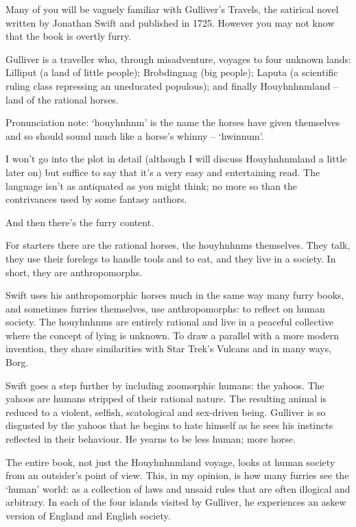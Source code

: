 
Many of you will be vaguely familiar with Gulliver's Travels, the satirical novel written by Jonathan Swift and published in 1725. However you may not know that the book is overtly furry.

Gulliver is a traveller who, through misadventure, voyages to four unknown lands: Lilliput (a land of little people); Brobdingnag (big people); Laputa (a scientific ruling class repressing an uneducated populous); and finally Houyhnhnmland -- land of the rational horses.

Pronunciation note: `houyhnhnm' is the name the horses have given themselves and so should sound much like a horse's whinny -- `hwinnum'.

I won't go into the plot in detail (although I will discuss Houyhnhnmland a little later on) but suffice to say that it's a very easy and entertaining read. The language isn't as antiquated as you might think; no more so than the contrivances used by some fantasy authors.

And then there's the furry content.

For starters there are the rational horses, the houyhnhnms themselves. They talk, they use their forelegs to handle tools and to eat, and they live in a society. In short, they are anthropomorphs.

Swift uses his anthropomorphic horses much in the same way many furry books, and sometimes furries themselves, use anthropomorphs: to reflect on human society. The houyhnhnms are entirely rational and live in a peaceful collective where the concept of lying is unknown. To draw a parallel with a more modern invention, they share similarities with Star Trek's Vulcans and in many ways, Borg.

Swift goes a step further by including zoomorphic humans: the yahoos. The yahoos are humans stripped of their rational nature. The resulting animal is reduced to a violent, selfish, scatological and sex-driven being. Gulliver is so disgusted by the yahoos that he begins to hate himself as he sees his instincts reflected in their behaviour. He yearns to be less human; more horse.

The entire book, not just the Houyhnhnmland voyage, looks at human society from an outsider's point of view. This, in my opinion, is how many furries see the `human' world: as a collection of laws and unsaid rules that are often illogical and arbitrary. In each of the four islands visited by Gulliver, he experiences an askew version of England and English society.

